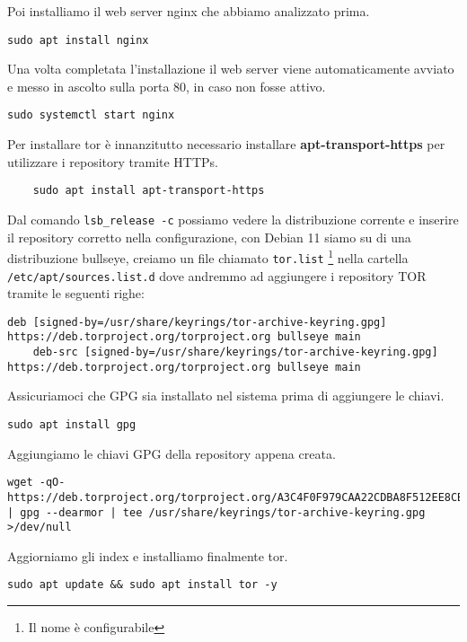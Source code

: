 Poi installiamo il web server nginx che abbiamo analizzato prima.
\begin{lstlisting}[caption={Installazione Nginx}]
    sudo apt install nginx
\end{lstlisting}

Una volta completata l'installazione il web server viene automaticamente avviato e messo in ascolto sulla porta 80, in caso non fosse attivo. \\
\begin{lstlisting}[caption={Avvio di Nginx}]
    sudo systemctl start nginx
\end{lstlisting}

Per installare tor è innanzitutto necessario installare \textbf{apt-transport-https} per utilizzare i repository tramite HTTPs.
\begin{lstlisting}
    sudo apt install apt-transport-https
\end{lstlisting}
Dal comando \lstinline{lsb_release -c} possiamo vedere la distribuzione corrente e inserire il repository corretto nella configurazione, con Debian 11 siamo su di una distribuzione bullseye, creiamo un file chiamato \lstinline{tor.list} \footnote{Il nome è configurabile} nella cartella \lstinline{/etc/apt/sources.list.d} dove andremmo ad aggiungere i repository TOR tramite le seguenti righe:
\begin{lstlisting}[caption={Tor Repository}]
    deb [signed-by=/usr/share/keyrings/tor-archive-keyring.gpg] https://deb.torproject.org/torproject.org bullseye main
    deb-src [signed-by=/usr/share/keyrings/tor-archive-keyring.gpg] https://deb.torproject.org/torproject.org bullseye main
\end{lstlisting}

Assicuriamoci che GPG sia installato nel sistema prima di aggiungere le chiavi.
\begin{lstlisting}[caption={Installazione GPG}]
    sudo apt install gpg
\end{lstlisting}

Aggiungiamo le chiavi GPG della repository appena creata.
\begin{lstlisting}[caption={Aggiunta chiavi gpg dal repository Tor}]
    wget -qO- https://deb.torproject.org/torproject.org/A3C4F0F979CAA22CDBA8F512EE8CBC9E886DDD89.asc | gpg --dearmor | tee /usr/share/keyrings/tor-archive-keyring.gpg >/dev/null
\end{lstlisting}

Aggiorniamo gli index e installiamo finalmente tor.
\begin{lstlisting}[caption={Installazione Tor}]
    sudo apt update && sudo apt install tor -y 
\end{lstlisting}

